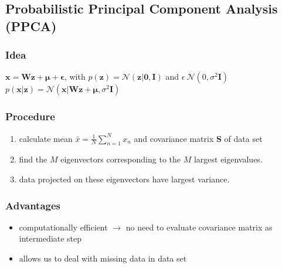 \documentclass[9pt,parskip]{scrartcl}
\begin{document}
\begin{multicols*}{4}
\subsection*{Probabilistic Principal Component Analysis (PPCA)}
\subsubsection*{Idea}
$\mathbf{x} = \mathbf{Wz} + \boldsymbol{\mu} + \boldsymbol{\epsilon} $, with $p(\mathbf{z}) = \mathcal{N}(\mathbf{z}|\mathbf{0,I})$ and $\epsilon ~ \mathcal{N}(0, \sigma^2\mathbf{I})$ \\
$p(\mathbf{x}|\mathbf{z}) = \mathcal{N}(\mathbf{x}|\mathbf{Wz} + \boldsymbol{\mu}, \sigma^2\mathbf{I}) $
\subsubsection*{Procedure}
\begin{enumerate}
	\item calculate mean $\bar{x} = \frac 1 N \sum_{n=1}^{N}x_n$ and covariance matrix \textbf{S} of data set
	\item find the $M$ eigenvectors corresponding to the $M$ largest eigenvalues.
	\item data projected on these eigenvectors have largest variance.
\end{enumerate}
\subsubsection*{Advantages}
\begin{itemize}
	\item computationally efficient $\to$ no need to evaluate covariance matrix as intermediate step
	\item allows us to deal with missing data in data set
\end{itemize}



\end{multicols*}
\end{document}
